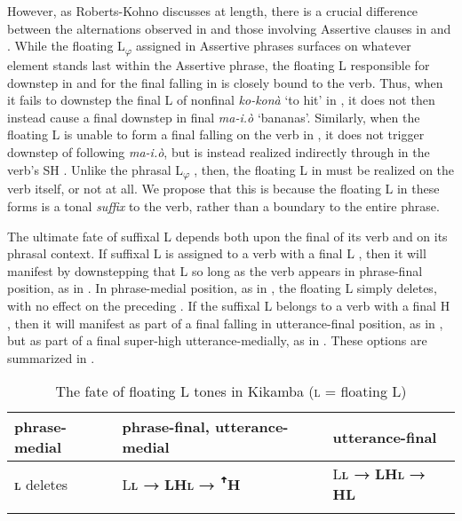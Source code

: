 \documentclass[output=paper,newtxmath,modfonts,nonflat,hidelinks]{langsci/langscibook}
\begin{document}
However, as Roberts-Kohno discusses at length, there is a crucial difference between the alternations observed in  and those involving Assertive clauses in  and . While the floating L\textsubscript{$\varphi $}  assigned in Assertive phrases surfaces on whatever element stands last within the Assertive phrase, the floating L responsible for downstep in  and for the final falling  in  is closely bound to the verb. Thus, when it fails to downstep the final L of nonfinal \textit{ko-konà} ‘to hit’ in , it does not then instead cause a final downstep in final \textit{ma-i.\`o} ‘bananas’. Similarly, when the floating L  is unable to form a final falling  on the verb in , it does not trigger downstep of following \textit{ma-i.\`o}, but is instead realized indirectly through in the verb’s SH . Unlike the phrasal L\textsubscript{$\varphi $} , then, the floating L  in  must be realized on the verb itself, or not at all. We propose that this is because the floating L  in these forms is a tonal \textit{suffix} to the verb, rather than a boundary  to the entire phrase.

The ultimate fate of suffixal L depends both upon the final  of its verb and on its phrasal context. If suffixal L is assigned to a verb with a final L , then it will manifest by downstepping that L so long as the verb appears in phrase-final position, as in . In phrase-medial position, as in , the floating L simply deletes, with no effect on the preceding . If the suffixal L belongs to a verb with a final H , then it will manifest as part of a final falling  in utterance-final position, as in , but as part of a final super-high  utterance-medially, as in . These options are summarized in .

\begin{table}
\begin{tabularx}{\textwidth}{lXp{25mm}}
\lsptoprule
 phrase-medial &  phrase-final, utterance-medial &  utterance-final\\
\midrule
\textbf{\textcircled{\textsc{l}}} deletes & {L\textbf{\textcircled{\textsc{l}} →} \textbf{{\↓}L}}\newline \textbf{H\textcircled{\textsc{l}}} \textbf{→ {ꜛ}H} & 
    {L\textbf{\textcircled{\textsc{l}} →} \textbf{{\↓}L}}\newline \textbf{H\textcircled{\textsc{l}}} \textbf{→ \textipa{\texttoptiebar}HL}\\  
\lspbottomrule  
\end{tabularx}
\caption{The fate of floating L tones in Kikamba (\textcircled{\textsc{l}} = floating L)}
\label{tab:jones:7}
\end{table}
\end{document}
